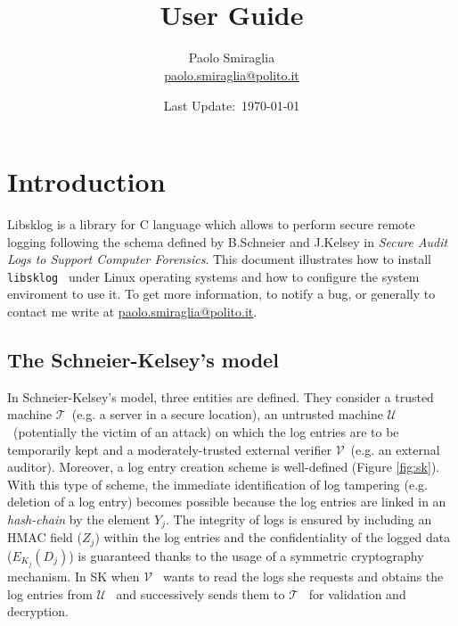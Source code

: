 \documentclass[a4paper,11pt,oneside]{report}
\author{Paolo Smiraglia \\ \small{\url{paolo.smiraglia@polito.it}}}
\title{\libsklog \\ User Guide}
\date{Last Update:~\today}
\def\libsklog{\texttt{libsklog}~\xspace}
\def\u{$\mathcal{U}$~\xspace}
\def\t{$\mathcal{T}$~\xspace}
\def\v{$\mathcal{V}$~\xspace}
\begin{document}
\maketitle
\tableofcontents


\chapter{Introduction}

Libsklog is a library for C language which allows to perform secure
remote logging following the schema defined by B.Schneier and
J.Kelsey in \emph{Secure Audit Logs to Support Computer Forensics}.
This document illustrates how to install \libsklog under Linux
operating systems and how to configure the system enviroment to use it.
To get more information, to notify a bug, or generally to contact me
write at \url{paolo.smiraglia@polito.it}.

\section{The Schneier-Kelsey's model}

In Schneier-Kelsey's model, three entities are defined. They
consider a trusted machine \t (e.g. a server in a secure location),
an untrusted machine \u (potentially the victim of an attack) on
which the log entries are to be temporarily kept and a
moderately-trusted external verifier \v (e.g. an external auditor).
Moreover, a log entry creation scheme is well-defined (Figure \ref{fig:sk}).
With this type of scheme, the immediate identification of log
tampering (e.g. deletion of a log entry) becomes possible because
the log entries are linked in an \emph{hash-chain} by the element
$Y_{j}$. The integrity of logs is ensured by including an
HMAC field ($Z_{j}$) within the log entries and the confidentiality of
the logged data ($E_{K_{j}}(D_{j})$) is guaranteed thanks to the
usage of a symmetric cryptography mechanism. In SK when \v wants
to read the logs she requests and obtains the log entries from \u
and successively sends them to \t for validation and decryption.
\end{document}
